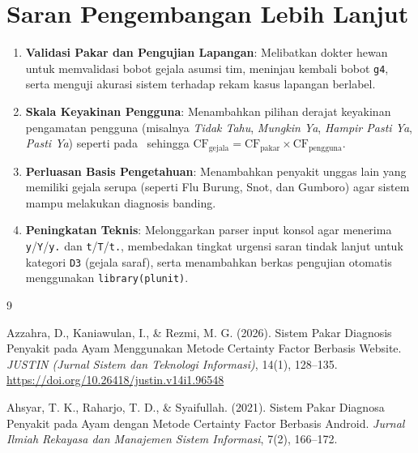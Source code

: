 \documentclass[12pt,a4paper]{report}
\begin{document}
\section{Saran Pengembangan Lebih Lanjut}
\begin{enumerate}
  \item \textbf{Validasi Pakar dan Pengujian Lapangan}: Melibatkan dokter hewan untuk memvalidasi bobot gejala asumsi tim, meninjau kembali bobot \texttt{g4}, serta menguji akurasi sistem terhadap rekam kasus lapangan berlabel.
  \item \textbf{Skala Keyakinan Pengguna}: Menambahkan pilihan derajat keyakinan pengamatan pengguna (misalnya \textit{Tidak Tahu}, \textit{Mungkin Ya}, \textit{Hampir Pasti Ya}, \textit{Pasti Ya}) seperti pada~\cite{azzahra2026} sehingga $\text{CF}_{\text{gejala}} = \text{CF}_{\text{pakar}} \times \text{CF}_{\text{pengguna}}$.
  \item \textbf{Perluasan Basis Pengetahuan}: Menambahkan penyakit unggas lain yang memiliki gejala serupa (seperti Flu Burung, Snot, dan Gumboro) agar sistem mampu melakukan diagnosis banding.
  \item \textbf{Peningkatan Teknis}: Melonggarkan parser input konsol agar menerima \texttt{y}/\texttt{Y}/\texttt{y.} dan \texttt{t}/\texttt{T}/\texttt{t.}, membedakan tingkat urgensi saran tindak lanjut untuk kategori \texttt{D3} (gejala saraf), serta menambahkan berkas pengujian otomatis menggunakan \texttt{library(plunit)}.
\end{enumerate}

\begin{thebibliography}{9}

Azzahra, D., Kaniawulan, I., \& Rezmi, M. G. (2026).
Sistem Pakar Diagnosis Penyakit pada Ayam Menggunakan Metode Certainty Factor Berbasis Website.
\textit{JUSTIN (Jurnal Sistem dan Teknologi Informasi)}, 14(1), 128--135.
\url{https://doi.org/10.26418/justin.v14i1.96548}

Ahsyar, T. K., Raharjo, T. D., \& Syaifullah. (2021).
Sistem Pakar Diagnosa Penyakit pada Ayam dengan Metode Certainty Factor Berbasis Android.
\textit{Jurnal Ilmiah Rekayasa dan Manajemen Sistem Informasi}, 7(2), 166--172.

\end{thebibliography}
\end{document}
